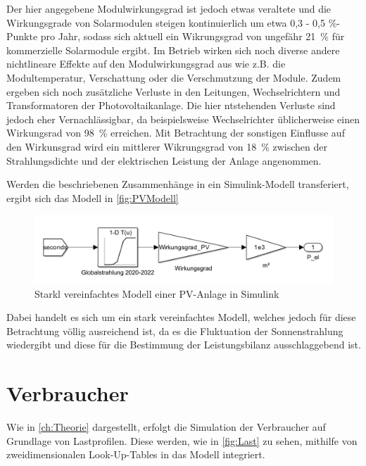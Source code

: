 Der hier angegebene Modulwirkungsgrad ist jedoch etwas veraltete und die Wirkungsgrade von Solarmodulen steigen kontinuierlich um etwa 0,3 - 0,5 \%-Punkte pro Jahr, sodass sich aktuell ein Wikrungsgrad von ungefähr 21~\% für kommerzielle Solarmodule ergibt. Im Betrieb wirken sich noch diverse andere nichtlineare Effekte auf den Modulwirkungsgrad aus wie z.B. die Modultemperatur, Verschattung oder die Verschmutzung der Module. Zudem ergeben sich noch zusätzliche Verluste in den Leitungen, Wechselrichtern und Transformatoren der Photovoltaikanlage. Die hier ntstehenden Verluste sind jedoch eher Vernachlässigbar, da beispielsweise Wechselrichter üblicherweise einen Wirkungsrad von 98~\% erreichen. Mit Betrachtung der sonstigen Einflusse auf den Wirkunsgrad wird ein mittlerer Wikrungsgrad von 18~\% zwischen der Strahlungsdichte und der elektrischen Leistung der Anlage angenommen. \cite{FaktenPV} 

Werden die beschriebenen Zusammenhänge in ein Simulink-Modell transferiert, ergibt sich das Modell in \autoref{fig:PVModell}

\begin{figure}[H]
	\centering
	\includegraphics[width=0.9\linewidth]{Abbildungen/PVModell.png}
	\caption{Starkl vereinfachtes Modell einer PV-Anlage in Simulink}
	\label{fig:PVModell}
\end{figure}

Dabei handelt es sich um ein stark vereinfachtes Modell, welches jedoch für diese Betrachtung völlig ausreichend ist, da es die Fluktuation der Sonnenstrahlung wiedergibt und diese für die Bestimmung der Leistungsbilanz ausschlaggebend ist.

\section{Verbraucher}

Wie in \autoref{ch:Theorie} dargestellt, erfolgt die Simulation der Verbraucher auf Grundlage von Lastprofilen. Diese werden, wie in \autoref{fig:Last} zu sehen, mithilfe von zweidimensionalen Look-Up-Tables in das Modell integriert. 

